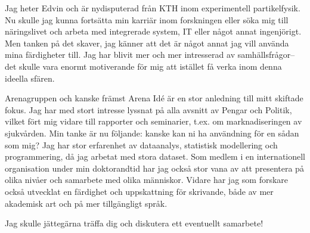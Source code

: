 \documentclass[11pt, a4paper]{../awesome-cv} %
\begin{document}
\makecvheader %

\makelettertitle %


\begin{cvletter}
\vspace{.6cm}

Jag heter Edvin och är nydisputerad från KTH inom experimentell partikelfysik.
Nu skulle jag kunna fortsätta min karriär inom forskningen eller söka mig till näringslivet och arbeta med integrerade system, IT eller något annat ingenjörigt.
Men tanken på det skaver, jag känner att det är något annat jag vill använda mina färdigheter till. 
Jag har blivit mer och mer intresserad av samhällsfrågor–det skulle vara enormt motiverande för mig att istället få verka inom denna ideella sfären.

Arenagruppen och kanske främst Arena Idé är en stor anledning till mitt skiftade fokus. %
Jag har med stort intresse lyssnat på alla avsnitt av Pengar och Politik, vilket fört mig vidare till rapporter och seminarier, t.ex. om marknadiseringen av sjukvården. %
Min tanke är nu följande: kanske kan ni ha användning för en sådan som mig?
Jag har stor erfarenhet av dataanalys, statistisk modellering och programmering, då jag arbetat med stora dataset.
Som medlem i en internationell organisation under min doktorandtid har jag också stor vana av att presentera på olika nivåer och samarbete med olika människor. 
Vidare har jag som forskare också utvecklat en färdighet och uppskattning för skrivande, både av mer akademisk art och på mer tillgängligt språk.

Jag skulle jättegärna träffa dig och diskutera ett eventuellt samarbete!


\end{cvletter}
\end{document}

